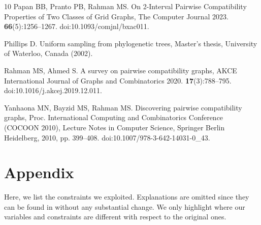 \documentclass{fundam}
\begin{document}
\begin{thebibliography}{10}
  Papan BB,  Pranto PB,  Rahman MS.
   On 2-Interval Pairwise Compatibility Properties of Two Classes of Grid Graphs, The Computer Journal  2023. {\bf 66}(5):1256--1267.
   doi:10.1093/comjnl/bxac011.


 Phillips D.
  Uniform sampling from phylogenetic trees, Master’s thesis, University of  Waterloo, Canada (2002).

 Rahman MS, Ahmed S.
  A survey on pairwise compatibility graphs, AKCE International Journal of Graphs and Combinatorics 2020. {\bf 17}(3):788--795.
  doi:10.1016/j.akcej.2019.12.011.


  Yanhaona MN,  Bayzid MS,  Rahman MS.
   Discovering pairwise compatibility graphs, Proc. International Computing and Combinatorics Conference (COCOON 2010),
   Lecture Notes in Computer Science, Springer Berlin Heidelberg, 2010, pp. 399--408. doi:10.1007/978-3-642-14031-0\_43.
\end{thebibliography}

\newpage

\section*{Appendix}

Here, we list the constraints we exploited. Explanations are omitted since they can be found in \cite{Calamoneri2013} without any substantial change. We only highlight where our variables and constraints are different with respect to the original ones.
\end{document}
